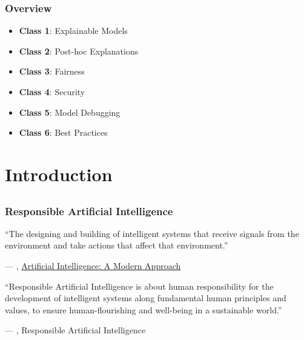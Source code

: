 \documentclass[11pt,aspectratio=169,hyperref={colorlinks}]{beamer}
\begin{document}
	
	\begin{frame}
	
		\frametitle{Overview}
		
		\begin{itemize}
			\item{\textbf{Class 1}: Explainable Models}
			\item{\textbf{Class 2}: Post-hoc Explanations}
			\item{\textbf{Class 3}: Fairness}
			\item{\textbf{Class 4}: Security}
			\item{\textbf{Class 5}: Model Debugging}
			\item{\textbf{Class 6}: Best Practices}
		\end{itemize}
			
					
	\end{frame}

	\section{Introduction}
		\subsection*{} %
	
		\begin{frame}
	
			\frametitle{Responsible Artificial Intelligence}
	

			\epigraph{``The designing and building of intelligent systems that receive signals from the environment and take actions that affect that environment.''}{--- \citet{russell2010artificial}, \href{https://aima.cs.berkeley.edu/}{Artificial Intelligence: A Modern Approach}}

			\epigraph{``Responsible Artificial Intelligence is about human responsibility for the development of intelligent systems along fundamental human principles and values, to ensure human-flourishing and well-being in a sustainable world.''}{--- \citet{dignum2019responsible}, Responsible Artificial Intelligence} 
	
		\end{frame}		
\end{document}
